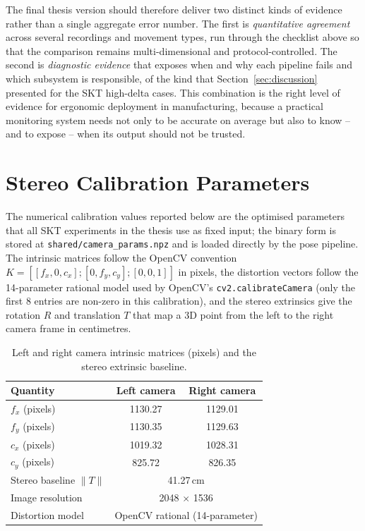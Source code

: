 \documentclass[12pt,a4paper]{article}
\begin{document}
The final thesis version should therefore deliver two distinct kinds of
evidence rather than a single aggregate error number.
The first is \emph{quantitative agreement} across several recordings and
movement types, run through the checklist above so that the comparison
remains multi-dimensional and protocol-controlled.
The second is \emph{diagnostic evidence} that exposes when and why each
pipeline fails and which subsystem is responsible, of the kind that
Section~\ref{sec:discussion} presented for the SKT high-delta cases.
This combination is the right level of evidence for ergonomic deployment
in manufacturing, because a practical monitoring system needs not only
to be accurate on average but also to know -- and to expose -- when its
output should not be trusted.

\clearpage
\appendix
\clearpage

\section{Stereo Calibration Parameters}
\label{app:calibration}

The numerical calibration values reported below are the optimised parameters
that all SKT experiments in the thesis use as fixed input; the
binary form is stored at \texttt{shared/camera\_params.npz} and is loaded
directly by the pose pipeline.
The intrinsic matrices follow the OpenCV convention $K = [[f_x, 0, c_x];
[0, f_y, c_y]; [0,0,1]]$ in pixels, the distortion vectors follow the
14-parameter rational model used by OpenCV's \texttt{cv2.calibrateCamera}
(only the first 8 entries are non-zero in this calibration), and the
stereo extrinsics give the rotation $R$ and translation $T$ that map a
3D point from the left to the right camera frame in centimetres.

\begin{table}[!htbp]
  \centering
  \caption{Left and right camera intrinsic matrices (pixels) and the stereo extrinsic baseline.}
  \label{tab:calib_intrinsics}
  \small
  \begin{tabular}{lcc}
    \toprule
    Quantity & Left camera & Right camera \\
    \midrule
    $f_x$ (pixels)            & 1130.27 & 1129.01 \\
    $f_y$ (pixels)            & 1130.35 & 1129.63 \\
    $c_x$ (pixels)            & 1019.32 & 1028.31 \\
    $c_y$ (pixels)            &  825.72 &  826.35 \\
    \midrule
    Stereo baseline $\|T\|$   & \multicolumn{2}{c}{41.27\,cm} \\
    Image resolution          & \multicolumn{2}{c}{2048 $\times$ 1536} \\
    Distortion model          & \multicolumn{2}{c}{OpenCV rational (14-parameter)} \\
    \bottomrule
  \end{tabular}
\end{table}
\end{document}
